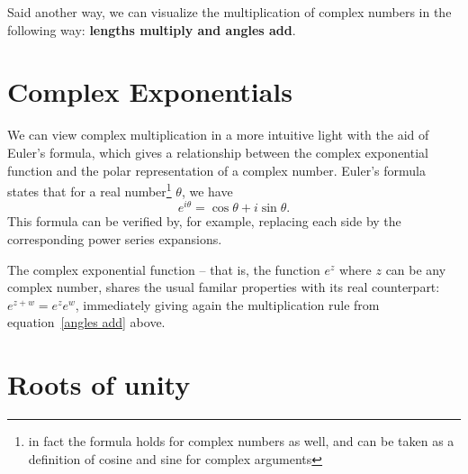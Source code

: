 \documentclass[12pt]{report}
\theoremstyle{plain}
\begin{document}
Said another way, we can visualize the multiplication of complex numbers in the following way: \textbf{lengths multiply and angles add}.

\section{Complex Exponentials} \label{complex exponentials}

We can view complex multiplication in a more intuitive light with the aid of Euler's formula, which gives a relationship between the complex exponential function and the polar representation of a complex number. Euler's formula states that for a real number\footnote{in fact the formula holds for complex numbers as well, and can be taken as a definition of cosine and sine for complex arguments} $\theta$, we have
\[e^{i \theta} = \cos \theta + i \sin \theta. \]
This formula can be verified by, for example, replacing each side by the corresponding power series expansions.

The complex exponential function -- that is, the function $e^z$ where $z$ can be any complex number, shares the usual familar properties with its real counterpart: $e^{z + w} = e^z e^w$, immediately giving again the multiplication rule from equation~\ref{angles add} above.

\section{Roots of unity}

%
%
\printindex
\end{document}
